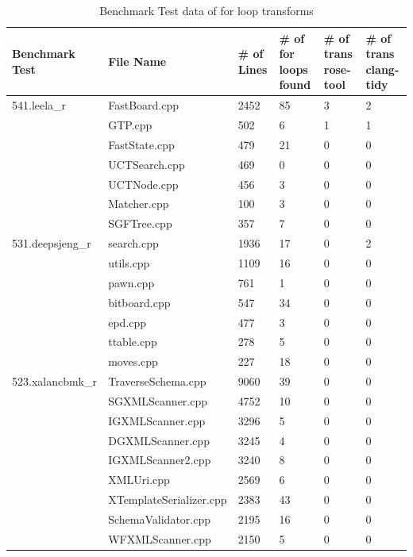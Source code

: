 \documentclass[bsc,frontabs,singlespacing,twoside,parskip,deptreport]{infthesis}
\begin{document}





\begin{landscape}
\begin{table}[H]
\centering
\begin{tabular}{|l|l|l|l|l|l|}
\hline
Benchmark Test & File Name & \# of Lines & \# of for loops found & \# of trans rose-tool & \# of trans clang-tidy \\ \hline
541.leela\_r & FastBoard.cpp & 2452 & 85 & 3 & 2 \\ \hline
 & GTP.cpp & 502 & 6 & 1 & 1 \\ \hline
 & FastState.cpp & 479 & 21 & 0 & 0 \\ \hline
 & UCTSearch.cpp & 469 & 0 & 0 & 0 \\ \hline
 & UCTNode.cpp & 456 & 3 & 0 & 0 \\ \hline
 & Matcher.cpp & 100 & 3 & 0 & 0 \\ \hline
 & SGFTree.cpp & 357 & 7 & 0 & 0 \\ \hline
531.deepsjeng\_r & search.cpp & 1936 & 17 & 0 & 2 \\ \hline
 & utils.cpp & 1109 & 16 & 0 & 0 \\ \hline
 & pawn.cpp & 761 & 1 & 0 & 0 \\ \hline
 & bitboard.cpp & 547 & 34 & 0 & 0 \\ \hline
 & epd.cpp & 477 & 3 & 0 & 0 \\ \hline
 & ttable.cpp & 278 & 5 & 0 & 0 \\ \hline
 & moves.cpp & 227 & 18 & 0 & 0 \\ \hline
523.xalancbmk\_r & TraverseSchema.cpp & 9060 & 39 & 0 & 0 \\ \hline
 & SGXMLScanner.cpp & 4752 & 10 & 0 & 0 \\ \hline
 & IGXMLScanner.cpp & 3296 & 5 & 0 & 0 \\ \hline
 & DGXMLScanner.cpp & 3245 & 4 & 0 & 0 \\ \hline
 & IGXMLScanner2.cpp & 3240 & 8 & 0 & 0 \\ \hline
 & XMLUri.cpp & 2569 & 6 & 0 & 0 \\ \hline
 & XTemplateSerializer.cpp & 2383 & 43 & 0 & 0 \\ \hline
 & SchemaValidator.cpp & 2195 & 16 & 0 & 0 \\ \hline
 & WFXMLScanner.cpp & 2150 & 5 & 0 & 0 \\ \hline
\end{tabular}
\caption{Benchmark Test data of for loop transforms }
\label{tab:for-tool-benchmark}
\end{table}
\end{landscape}
\end{document}
